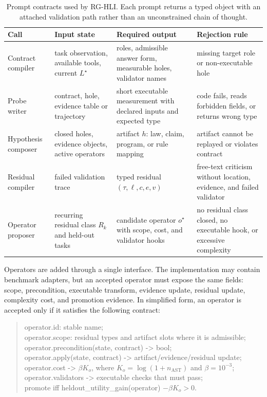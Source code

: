 \documentclass[letterpaper]{article}
\newcommand{\tblhdr}{\rowcolor{headerrow}}
\newcommand{\methodshort}{\textsc{RG-HLI}\xspace}
\begin{document}
\begin{table}[!htbp]
\centering
\small
\begin{tabularx}{0.96\textwidth}{|l|Y|Y|Y|}
\hline
\tblhdr
Call & Input state & Required output & Rejection rule \\
\hline
Contract compiler & task observation, available tools, current $L^\star$ & roles, admissible answer form, measurable holes, validator names & missing target role or non-executable hole \\
\hline
Probe writer & contract, hole, evidence table or trajectory & short executable measurement with declared inputs and expected type & code fails, reads forbidden fields, or returns wrong type \\
\hline
Hypothesis composer & closed holes, evidence objects, active operators & artifact $h$: law, claim, program, or rule mapping & artifact cannot be replayed or violates contract \\
\hline
Residual compiler & failed validation trace & typed residual $(\tau,\ell,c,e,v)$ & free-text criticism without location, evidence, and failed validator \\
\hline
Operator proposer & recurring residual class $R_k$ and held-out tasks & candidate operator $o^\star$ with scope, cost, and validator hooks & no residual class closed, no executable hook, or excessive complexity \\
\hline
\end{tabularx}
\caption{Prompt contracts used by \methodshort. Each prompt returns a typed
object with an attached validation path rather than an unconstrained chain of
thought.}
\label{tab:prompt_contracts}
\end{table}

Operators are added through a single interface. The implementation may contain
benchmark adapters, but an accepted operator must expose the same fields:
scope, precondition, executable transform, evidence update, residual update,
complexity cost, and promotion evidence. In simplified form, an operator is
accepted only if it satisfies the following contract:

\begin{quote}
\small
\ttfamily
operator.id: stable name;\\
operator.scope: residual types and artifact slots where it is admissible;\\
operator.precondition(state, contract) -> bool;\\
operator.apply(state, contract) -> artifact/evidence/residual update;\\
operator.cost -> $\beta K_o$, where $K_o=\log(1+n_{\mathrm{AST}})$ and $\beta=10^{-3}$;\\
operator.validators -> executable checks that must pass;\\
promote iff heldout\_utility\_gain(operator) $-\beta K_o>0$.
\end{quote}
\end{document}
